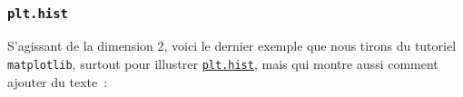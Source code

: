     \begin{center}
    \end{center}
    { \hspace*{\fill} \\}
    
    \hypertarget{plt.hist}{%
\subsubsection{\texorpdfstring{\texttt{plt.hist}}{plt.hist}}\label{plt.hist}}

    S'agissant de la dimension 2, voici le dernier exemple que nous tirons
du tutoriel \texttt{matplotlib}, surtout pour illustrer
\href{https://matplotlib.org/api/_as_gen/matplotlib.pyplot.hist.html?highlight=matplotlib\%20pyplot\%20hist\#matplotlib.pyplot.hist}{\texttt{plt.hist}},
mais qui montre aussi comment ajouter du texte~:

